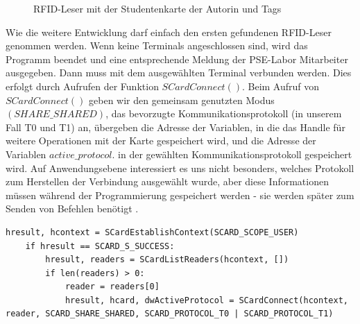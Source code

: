 \begin{figure}
	\caption{RFID-Leser mit der Studentenkarte der Autorin und Tags}
	\label{fig:baga_stud}
\end{figure} 
Wie die weitere Entwicklung darf einfach den ersten gefundenen RFID-Leser genommen werden. Wenn keine Terminals angeschlossen sind, wird das Programm beendet und eine entsprechende Meldung der PSE-Labor Mitarbeiter ausgegeben. Dann muss mit dem ausgewählten Terminal verbunden werden. Dies erfolgt durch Aufrufen der Funktion $SCardConnect()$. Beim Aufruf von $SCardConnect()$ geben wir den gemeinsam genutzten Modus $(SHARE\_SHARED)$, das bevorzugte Kommunikationsprotokoll (in unserem Fall T0 und T1) an, übergeben die Adresse der Variablen, in die das Handle für weitere Operationen mit der Karte gespeichert wird, und die Adresse der Variablen $active\_protocol$. in der gewählten Kommunikationsprotokoll gespeichert wird. Auf Anwendungsebene interessiert es uns nicht besonders, welches Protokoll zum Herstellen der Verbindung ausgewählt wurde, aber diese Informationen müssen während der Programmierung gespeichert werden - sie werden später zum Senden von Befehlen benötigt \cite[p. 104]{chirico:smart_card}.
\begin{lstlisting}[caption={Funktion SCardEstablishContext},captionpos=b]
hresult, hcontext = SCardEstablishContext(SCARD_SCOPE_USER)
	if hresult == SCARD_S_SUCCESS:
		hresult, readers = SCardListReaders(hcontext, [])
		if len(readers) > 0:
			reader = readers[0]
			hresult, hcard, dwActiveProtocol = SCardConnect(hcontext, reader, SCARD_SHARE_SHARED, SCARD_PROTOCOL_T0 | SCARD_PROTOCOL_T1)
\end{lstlisting}

